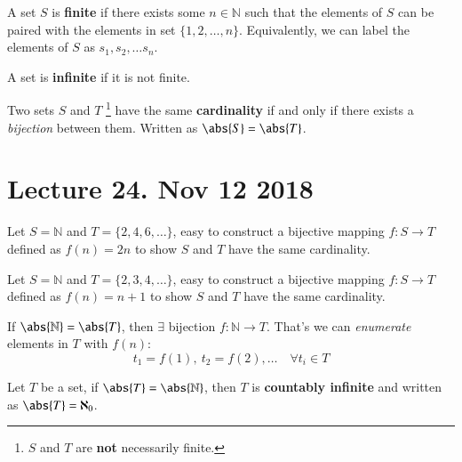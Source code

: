 \documentclass[10pt]{article}
\begin{document}
		\begin{definition}
			A set $S$ is \textbf{finite} if there exists some $n\in \mathbb{N}$ such that the elements of $S$ can be paired with the elements in set $\{1, 2, \dots, n\}$. Equivalently, we can label the elements of $S$ as $s_1, s_2, \dots s_n$.
		\end{definition}
		
		\begin{definition}
			A set is \textbf{infinite} if it is not finite.
		\end{definition}
		
		\begin{definition}
			Two sets $S$ and $T$ \footnote{$S$ and $T$ are \textbf{not} necessarily finite.} have the same \textbf{cardinality} if and only if there exists a \emph{bijection} between them. Written as $\abs{S} = \abs{T}$.
		\end{definition}
		
	\section{Lecture 24. Nov 12 2018}
		\begin{example}
			Let $S = \mathbb{N}$ and $T = \{2,4,6,\dots\}$, easy to construct a bijective mapping $f:S\to T$ defined as $f(n) = 2n$ to show $S$ and $T$ have the same cardinality.
		\end{example}

		\begin{example}
			Let $S = \mathbb{N}$ and $T = \{2,3,4,\dots\}$, easy to construct a bijective mapping $f:S\to T$ defined as $f(n) = n+1$ to show $S$ and $T$ have the same cardinality.
		\end{example}
		
		\begin{remark}
			If $\abs{\mathbb{N}} = \abs{T}$, then $\exists$ bijection $f:\mathbb{N} \to T$. That's we can \emph{enumerate} elements in $T$ with $f(n)$: 
			\[
				t_1 = f(1),\ t_2 = f(2),\dots \quad \forall t_i \in T
			\]
		\end{remark}
		
		\begin{definition}
			Let $T$ be a set, if $\abs{T} = \abs{\mathbb{N}}$, then $T$ is \textbf{countably infinite} and written as $\abs{T} = \aleph_0$.
		\end{definition}
		
\end{document}
